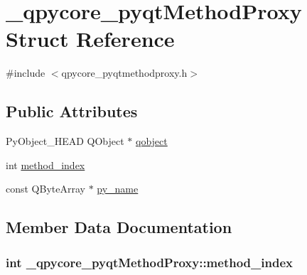 \hypertarget{struct__qpycore__pyqtMethodProxy}{}\section{\+\_\+qpycore\+\_\+pyqt\+Method\+Proxy Struct Reference}
\label{struct__qpycore__pyqtMethodProxy}


{\ttfamily \#include $<$qpycore\+\_\+pyqtmethodproxy.\+h$>$}

\subsection*{Public Attributes}
\begin{DoxyCompactItemize}
\item 
Py\+Object\+\_\+\+H\+E\+A\+D Q\+Object $\ast$ \hyperlink{struct__qpycore__pyqtMethodProxy_a2f5b059a8e34aaf6a7ff431d3e9f01de}{qobject}
\item 
int \hyperlink{struct__qpycore__pyqtMethodProxy_ad13147050303414905109d6f7bfea61e}{method\+\_\+index}
\item 
const Q\+Byte\+Array $\ast$ \hyperlink{struct__qpycore__pyqtMethodProxy_aa01d1168a8bad81f7864ff02192b3387}{py\+\_\+name}
\end{DoxyCompactItemize}


\subsection{Member Data Documentation}
\hypertarget{struct__qpycore__pyqtMethodProxy_ad13147050303414905109d6f7bfea61e}{}
\subsubsection[{method\+\_\+index}]{\setlength{\rightskip}{0pt plus 5cm}int \+\_\+qpycore\+\_\+pyqt\+Method\+Proxy\+::method\+\_\+index}\label{struct__qpycore__pyqtMethodProxy_ad13147050303414905109d6f7bfea61e}
\hypertarget{struct__qpycore__pyqtMethodProxy_aa01d1168a8bad81f7864ff02192b3387}{}
